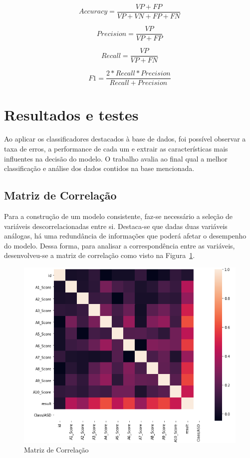 \documentclass{template/sig-alternate-05-2015}
\begin{document}
    \begin{equation}
      Accuracy = \frac{VP + FP}{VP+VN+FP+FN}
      \label{eqA}
    \end{equation}

    \begin{equation}
      Precision = \frac{VP}{VP+FP}
      \label{eqP}
    \end{equation}

    \begin{equation}
      Recall = \frac{VP}{VP+FN}
      \label{eqR}
    \end{equation}

    \begin{equation}
      F1 = \frac{2*Recall * Precision}{Recall+Precision}
      \label{eqF1}
    \end{equation}

    \section{Resultados e testes}

    Ao aplicar os classificadores destacados à base de dados, foi
    possível observar a taxa de erros, a performance de cada um e
    extrair as características mais influentes na decisão do modelo. O
    trabalho avalia ao final qual a melhor classificação e análise dos
    dados contidos na base mencionada.

    \subsection{Matriz de Correlação}

    Para a construção de um modelo consistente, faz-se necessário a
    seleção de variáveis descorrelacionadas entre si. Destaca-se que
    dadas duas variáveis análogas, há uma redundância de informações
    que poderá afetar o desempenho do modelo. Dessa forma, para
    analisar a correspondência entre as variáveis, desenvolveu-se a
    matriz de correlação como visto na Figura~\ref{fig:correlacao}.

    \begin{figure}[!h]
      \centering
      \includegraphics[width=.5\textwidth]{imagens/correlacao.png}
      \caption{Matriz de Correlação}
      \label{fig:correlacao}
    \end{figure}
\end{document}
